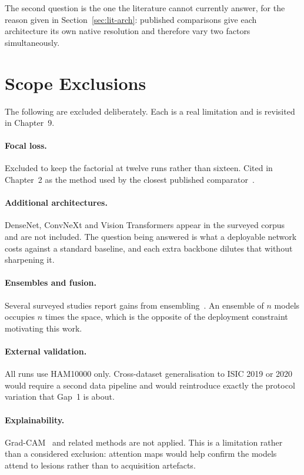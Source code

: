 The second question is the one the literature cannot currently answer, for the reason
given in Section~\ref{sec:lit-arch}: published comparisons give each architecture its
own native resolution and therefore vary two factors simultaneously.

\section{Scope Exclusions}
\label{sec:scope}

The following are excluded deliberately. Each is a real limitation and is revisited in
Chapter~9.

\paragraph{Focal loss.} Excluded to keep the factorial at twelve runs rather than
sixteen. Cited in Chapter~2 as the method used by the closest published
comparator~\cite{le2020classweightedfocal}.

\paragraph{Additional architectures.} DenseNet, ConvNeXt and Vision Transformers appear
in the surveyed corpus~\cite{wei2023densenetconvnext} and are not included. The question
being answered is what a deployable network costs against a standard baseline, and each
extra backbone dilutes that without sharpening it.

\paragraph{Ensembles and fusion.} Several surveyed studies report gains from
ensembling~\cite{chiu2025ensemble, alruwaili2025fusion}. An ensemble of $n$ models
occupies $n$ times the space, which is the opposite of the deployment constraint
motivating this work.

\paragraph{External validation.} All runs use HAM10000 only. Cross-dataset
generalisation to ISIC 2019 or 2020 would require a second data pipeline and would
reintroduce exactly the protocol variation that Gap~1 is about.

\paragraph{Explainability.} Grad-CAM~\cite{selvaraju2017gradcam} and related methods are
not applied. This is a limitation rather than a considered exclusion: attention maps
would help confirm the models attend to lesions rather than to acquisition artefacts.

